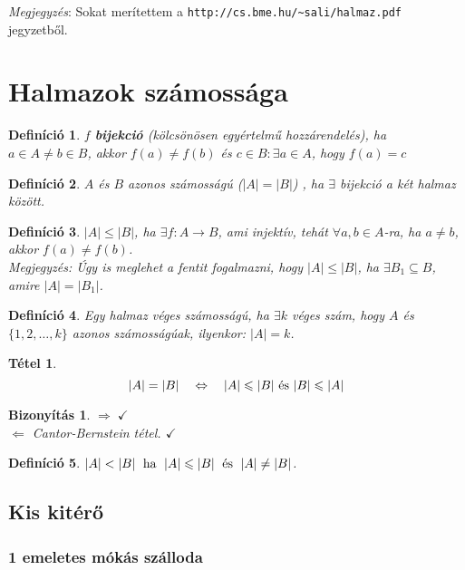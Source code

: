 \documentclass[a4paper,12pt,twoside]{book}
\newtheorem{defi}{Definíció}[chapter]
\newtheorem{tetel}{Tétel}[chapter]
\theoremstyle{break}
\newtheorem{bizNL}[biz]{Bizonyítás}
\begin{document}
\emph{Megjegyzés}: Sokat merítettem a \texttt{http://cs.bme.hu/\textasciitilde sali/halmaz.pdf} jegyzetből.

\section{Halmazok számossága}

\begin{defi}
 $f$ \textbf{bijekció} (kölcsönösen egyértelmű hozzárendelés), ha $a\in A\neq b\in B$, akkor $f(a)\neq f(b)$ és $c\in B : \exists a\in A$, hogy $f(a) = c$
\end{defi}

\begin{defi}
$A$ és $B$ azonos számosságú ($|A| = |B|$) , ha $\exists$ bijekció a két halmaz között.
\end{defi}

\begin{defi}
 $|A|\leqslant |B|$, ha $\exists f: A \to B$, ami injektív, tehát $\forall a,b\in A$-ra, ha $a\neq b$, akkor $f(a)\neq f(b)$.\\
 \emph{Megjegyzés}: Úgy is meglehet a fentit fogalmazni, hogy $|A|\leqslant |B|$, ha $\exists B_1\subseteq B$, amire $|A|=|B_1|$.
\end{defi}

\begin{defi}
 Egy halmaz \textit{véges} számosságú, ha $\exists k$ véges szám, hogy $A$ és $\{1,2,\ldots,k\}$ azonos számosságúak, ilyenkor: $|A| = k$.
\end{defi}

\begin{tetel}
 \[|A|=|B| \quad \Leftrightarrow \quad |A|\leqslant |B| \hbox{ és }  |B|\leqslant |A|\]
\end{tetel}
\begin{bizNL}
 $\Rightarrow \; \checkmark$\\ 
 $\Leftarrow$ Cantor-Bernstein tétel. $\checkmark$
\end{bizNL}

\begin{defi} $|A| < |B| \; \hbox{ ha } \; |A| \leqslant |B| \; \hbox{ és }\; |A| \neq |B|$.\end{defi}

\subsection{Kis kitérő}

\subsubsection{1 emeletes mókás szálloda}
\end{document}
